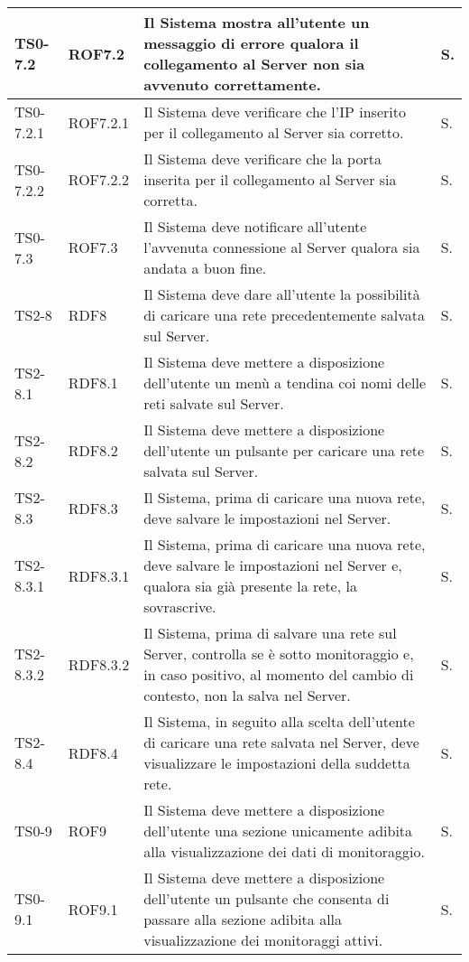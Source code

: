 \begin{longtable}{|C{.15\textwidth}|C{.14\textwidth}|m{.51\textwidth}|C{.08\textwidth}|}
\hline
{}TS0-7.2 & ROF7.2 & Il Sistema mostra all'utente un messaggio di errore qualora il collegamento al Server non sia avvenuto correttamente. & S. \\
\hline
TS0-7.2.1 & ROF7.2.1 & Il Sistema deve verificare che l'IP inserito per il collegamento al Server sia corretto. & S. \\
\hline
{}TS0-7.2.2 & ROF7.2.2 & Il Sistema deve verificare che la porta inserita per il collegamento al Server sia corretta. & S. \\
\hline
TS0-7.3 & ROF7.3 & Il Sistema deve notificare all'utente l'avvenuta connessione al Server qualora sia andata a buon fine.  & S. \\
\hline
{}TS2-8 & RDF8 & Il Sistema deve dare all'utente la possibilità di caricare una rete precedentemente salvata sul Server. & S. \\
\hline
TS2-8.1 & RDF8.1 & Il Sistema deve mettere a disposizione dell'utente un menù a tendina coi nomi delle reti salvate sul Server. & S. \\
\hline
{}TS2-8.2 & RDF8.2 & Il Sistema deve mettere a disposizione dell'utente un pulsante per caricare una rete salvata sul Server. & S. \\
\hline
TS2-8.3 & RDF8.3 & Il Sistema, prima di caricare una nuova rete, deve salvare le impostazioni nel Server. & S. \\
\hline
{}TS2-8.3.1 & RDF8.3.1 & Il Sistema, prima di caricare una nuova rete, deve salvare le impostazioni nel Server e, qualora sia già presente la rete, la sovrascrive. & S. \\
\hline
TS2-8.3.2 & RDF8.3.2 & Il Sistema, prima di salvare una rete sul Server, controlla se è sotto monitoraggio e, in caso positivo, al momento del cambio di contesto, non la salva nel Server. & S. \\
\hline
{}TS2-8.4 & RDF8.4 & Il Sistema, in seguito alla scelta dell'utente di caricare una rete salvata nel Server, deve visualizzare le impostazioni della suddetta rete. & S. \\
\hline
TS0-9 & ROF9 & Il Sistema deve mettere a disposizione dell'utente una sezione unicamente adibita alla visualizzazione dei dati di monitoraggio. & S. \\
\hline
{}TS0-9.1 & ROF9.1 & Il Sistema deve mettere a disposizione dell'utente un pulsante che consenta di passare alla sezione adibita alla visualizzazione dei monitoraggi attivi. & S. \\

\end{longtable}
